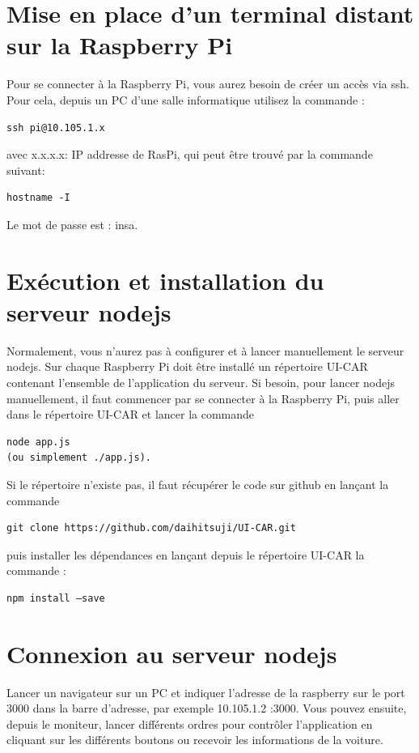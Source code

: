 \documentclass[11pt, a4paper]{paper}
\begin{document}
\section{Mise en place d’un terminal distant sur la Raspberry Pi}
Pour se connecter à la Raspberry Pi, vous aurez besoin de créer un accès via ssh. Pour cela, depuis un PC d’une salle informatique utilisez la commande :
\begin{verbatim}
ssh pi@10.105.1.x
\end{verbatim} 
avec x.x.x.x: IP addresse de RasPi, qui peut être trouvé par la commande suivant:
\begin{verbatim}
hostname -I
\end{verbatim}
Le mot de passe est : insa.

\section{Exécution et installation du serveur nodejs}
Normalement, vous n’aurez pas à configurer et à lancer manuellement le serveur nodejs. Sur chaque Raspberry Pi doit être installé un répertoire UI-CAR contenant l’ensemble de l’application du serveur. Si besoin, pour lancer nodejs manuellement, il faut commencer par se connecter à la Raspberry Pi, puis aller dans le répertoire UI-CAR et lancer la commande 
\begin{verbatim}
node app.js 
(ou simplement ./app.js).
\end{verbatim}
Si le répertoire n’existe pas, il faut récupérer le code sur github en lançant la commande
\begin{verbatim}
git clone https://github.com/daihitsuji/UI-CAR.git
\end{verbatim}
puis installer les dépendances en lançant depuis le répertoire
UI-CAR la commande :
\begin{verbatim}
npm install –save
\end{verbatim}

\section{Connexion au serveur nodejs}
Lancer un navigateur sur un PC et indiquer l’adresse de la raspberry sur le port 3000 dans
la barre d’adresse, par exemple 10.105.1.2 :3000. Vous pouvez ensuite, depuis le moniteur,
lancer différents ordres pour contrôler l’application en cliquant sur les différents boutons ou recevoir les informations de la voiture.
\end{document}
